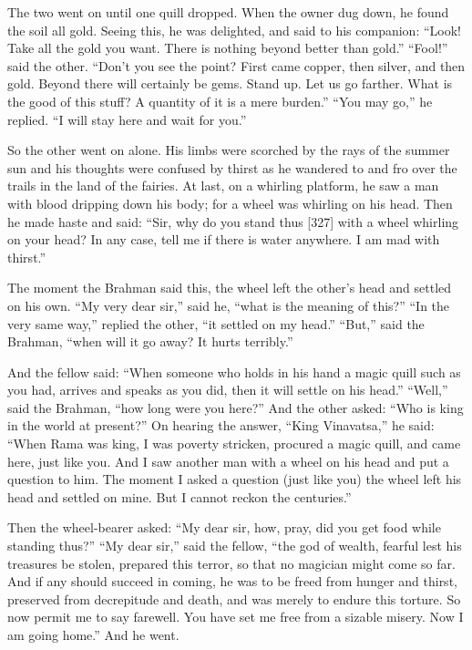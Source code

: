 \documentclass{article}
\begin{document}
The two went on until one quill dropped. When the owner dug down,
he found the soil all gold. Seeing this, he was delighted, and said
to his companion:
``Look! Take all the gold you want. There is nothing beyond better than gold.''
``Fool!'' said the other.
``Don't you see the point? First came copper, then silver, and then gold. Beyond there will certainly be gems. Stand up. Let us go farther. What is the good of this stuff? A quantity of it is a mere burden.''
``You may go,'' he replied. ``I will stay here and wait for you.''

So the other went on alone. His limbs were scorched by the rays of
the summer sun and his thoughts were confused by thirst as he
wandered to and fro over the trails in the land of the fairies. At
last, on a whirling platform, he saw a man with blood dripping down
his body; for a wheel was whirling on his head. Then he made haste
and said:
``Sir, why do you stand thus [327] with a wheel whirling on your head? In any case, tell me if there is water anywhere. I am mad with thirst.''

The moment the Brahman said this, the wheel left the other's head
and settled on his own. ``My very dear sir,'' said he,
``what is the meaning of this?'' ``In the very same way,'' replied
the other, ``it settled on my head.'' ``But,'' said the Brahman,
``when will it go away? It hurts terribly.''

And the fellow said:
``When someone who holds in his hand a magic quill such as you had, arrives and speaks as you did, then it will settle on his head.''
``Well,'' said the Brahman, ``how long were you here?'' And the
other asked: ``Who is king in the world at present?'' On hearing
the answer, ``King Vinavatsa,'' he said:
``When Rama was king, I was poverty stricken, procured a magic quill, and came here, just like you. And I saw another man with a wheel on his head and put a question to him. The moment I asked a question (just like you) the wheel left his head and settled on mine. But I cannot reckon the centuries.''

Then the wheel-bearer asked:
``My dear sir, how, pray, did you get food while standing thus?''
``My dear sir,'' said the fellow,
``the god of wealth, fearful lest his treasures be stolen, prepared this terror, so that no magician might come so far. And if any should succeed in coming, he was to be freed from hunger and thirst, preserved from decrepitude and death, and was merely to endure this torture. So now permit me to say farewell. You have set me free from a sizable misery. Now I am going home.''
And he went.
\end{document}
